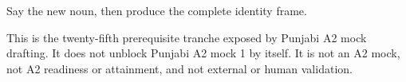 \begin{tcolorbox}[breakable,colback=teal!4,colframe=teal!35!black,title={Before you move on}]
Say the new noun, then produce the complete identity frame.

This is the twenty-fifth prerequisite tranche exposed by Punjabi A2 mock drafting. It does not unblock Punjabi A2 mock 1 by itself. It is not an A2 mock, not A2 readiness or attainment, and not external or human validation.
\end{tcolorbox}
